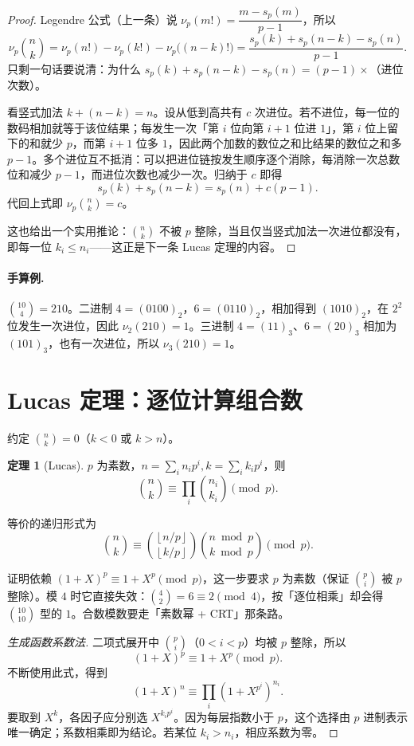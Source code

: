 \documentclass[UTF8,a4paper,11pt,twoside,openright,fontset=fandol]{ctexbook}
\theoremstyle{definition}
\newtheorem{theorem}[definition]{定理}
\newcommand{\floor}[1]{\left\lfloor #1\right\rfloor}
\begin{document}
\begin{proof}
Legendre 公式（上一条）说 $\nu_p(m!)=\dfrac{m-s_p(m)}{p-1}$，所以
\[
 \nu_p\binom{n}{k}=\nu_p(n!)-\nu_p(k!)-\nu_p\big((n-k)!\big)
 =\frac{s_p(k)+s_p(n-k)-s_p(n)}{p-1}.
\]
只剩一句话要说清：为什么 $s_p(k)+s_p(n-k)-s_p(n)=(p-1)\times$（进位次数）。

看竖式加法 $k+(n-k)=n$。设从低到高共有 $c$ 次进位。若不进位，每一位的数码相加就等于该位结果；每发生一次「第 $i$ 位向第 $i+1$ 位进 $1$」，第 $i$ 位上留下的和就少 $p$，而第 $i+1$ 位多 $1$，因此两个加数的数位之和比结果的数位之和多 $p-1$。多个进位互不抵消：可以把进位链按发生顺序逐个消除，每消除一次总数位和减少 $p-1$，而进位次数也减少一次。归纳于 $c$ 即得
\[
 s_p(k)+s_p(n-k)=s_p(n)+c(p-1).
\]
代回上式即 $\nu_p\binom nk=c$。

这也给出一个实用推论：$\binom nk$ 不被 $p$ 整除，当且仅当竖式加法一次进位都没有，即每一位 $k_i\le n_i$——这正是下一条 Lucas 定理的内容。
\end{proof}
\paragraph{手算例.} $\binom{10}{4}=210$。二进制 $4=(0100)_2$，$6=(0110)_2$，相加得到 $(1010)_2$，在 $2^2$ 位发生一次进位，因此 $\nu_2(210)=1$。三进制 $4=(11)_3$、$6=(20)_3$ 相加为 $(101)_3$，也有一次进位，所以 $\nu_3(210)=1$。
\section{Lucas 定理：逐位计算组合数}
约定 $\binom nk=0$（$k<0$ 或 $k>n$）。
\begin{theorem}[Lucas]
$p$ 为素数，$n=\sum_i n_ip^i,k=\sum_i k_ip^i$，则
\[
 \binom nk\equiv\prod_i\binom{n_i}{k_i}\pmod p.
\]


等价的递归形式为
\[
 \binom nk\equiv\binom{\floor{n/p}}{\floor{k/p}}
 \binom{n\bmod p}{k\bmod p}\pmod p.
\]
\end{theorem}

\begin{tip}
证明依赖 $(1+X)^p\equiv1+X^p\pmod p$，这一步要求 $p$ 为素数（保证 $\binom pi$ 被 $p$ 整除）。模 $4$ 时它直接失效：$\binom42=6\equiv2\pmod4$，按「逐位相乘」却会得 $\binom{10}{10}$ 型的 $1$。合数模数要走「素数幂 + CRT」那条路。
\end{tip}


\begin{proof}[生成函数系数法]
二项式展开中 $\binom pi$（$0<i<p$）均被 $p$ 整除，所以
\[
(1+X)^p\equiv1+X^p\pmod p.
\]
不断使用此式，得到
\[
 (1+X)^n\equiv\prod_i(1+X^{p^i})^{n_i}.
\]
要取到 $X^k$，各因子应分别选 $X^{k_ip^i}$。因为每层指数小于 $p$，这个选择由 $p$ 进制表示唯一确定；系数相乘即为结论。若某位 $k_i>n_i$，相应系数为零。
\end{proof}
\end{document}
